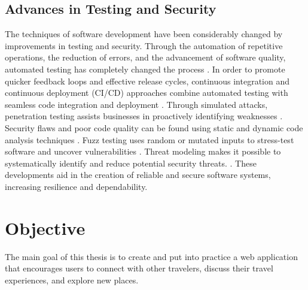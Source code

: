 \subsection{Advances in Testing and Security}
\par The techniques of software development have been considerably changed by improvements in testing and security. Through the automation of repetitive operations, the reduction of errors, and the advancement of software quality, automated testing has completely changed the process \cite{Nguyen2016}. In order to promote quicker feedback loops and effective release cycles, continuous integration and continuous deployment (CI/CD) approaches combine automated testing with seamless code integration and deployment \cite{HumbleFarley2010}. Through simulated attacks, penetration testing assists businesses in proactively identifying weaknesses \cite{Engebretson2013}. Security flaws and poor code quality can be found using static and dynamic code analysis techniques \cite{Spinellis2006}. Fuzz testing uses random or mutated inputs to stress-test software and uncover vulnerabilities \cite{Sutton2007}. Threat modeling makes it possible to systematically identify and reduce potential security threats. \cite{Shostack2014}. These developments aid in the creation of reliable and secure software systems, increasing resilience and dependability.



\section{Objective}
\par The main goal of this thesis is to create and put into practice a web application that encourages users to connect with other travelers, discuss their travel experiences, and explore new places.